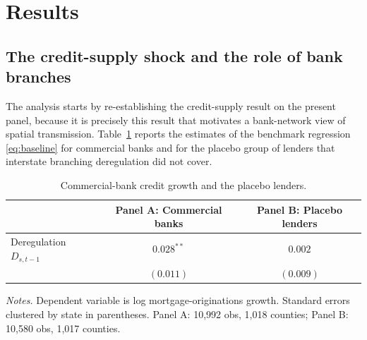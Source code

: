 \section{Results}\label{sec:results}

\subsection{The credit-supply shock and the role of bank branches}
\label{sec:fi-results}

The analysis starts by re-establishing the \cite{favara2015} credit-supply
result on the present panel, because it is precisely this result that motivates a
bank-network view of spatial transmission. Table~\ref{tab:placebo} reports the estimates of the
benchmark regression \eqref{eq:baseline} for commercial banks and for the placebo
group of lenders that interstate branching deregulation did not cover. 

\begin{table}[htbp]
  \centering
  \caption{Commercial-bank credit growth and the placebo lenders.}
  \label{tab:placebo}
  \begin{tabular}{lcc}
    \toprule
     & Panel A: Commercial banks & Panel B: Placebo lenders \\
    \midrule
    Deregulation $D_{s,t-1}$ & $0.028^{**}$ & $0.002$ \\
                             & $(0.011)$ & $(0.009)$ \\
    \bottomrule
  \end{tabular}
  \begin{tablenotes}\footnotesize
  \item \emph{Notes.} Dependent variable is log mortgage-originations growth. Standard errors clustered by state in parentheses. Panel A: 10,992 obs, 1,018 counties; Panel B: 10,580 obs, 1,017 counties.
  \end{tablenotes}
\end{table}

